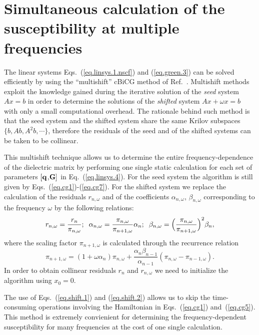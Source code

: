\documentclass[twocolumn,prb,showpacs,superscriptaddress]{revtex4}
\def\w{\omega}
\def\q{{\bf q}}
\def\G{{\bf G}}
\begin{document}
\section{Simultaneous calculation of the susceptibility at multiple frequencies}\label{app.multishift}

The linear systems Eqs.\ (\ref{eq.linsys.1.nscf}) and (\ref{eq.green.3})
can be solved efficiently by using the ``multishift'' 
cBiCG method of Ref.~.
Multishift methods exploit the knowledge gained during the iterative
solution of the {\it seed} system $Ax=b$ in order to determine the solutions 
of the {\it shifted} system $Ax+\w x=b$ with only a small computational overhead.
The rationale behind such method is that the seed system and the
shifted system share the same Krilov subspaces $\{b,Ab,A^2b,\cdots\}$,
therefore the residuals of the seed and of the shifted
systems can be taken to be collinear.\cite{frommer}

This multishift technique allows us to determine the
entire frequency-dependence of the dielectric matrix
by performing one single static calculation for each set of parameters $[\q$,$\G]$ in
Eq.\ (\ref{eq.linsys.4}).
For the seed system the algorithm is still given by Eqs.\ (\ref{eq.cg1})-(\ref{eq.cg7}).
For the shifted system we replace the calculation of the residuals
$r_{n,\w}$ and of the coefficients $\alpha_{n,\w}$, $\beta_{n,\w}$ corresponding
to the frequency $\w$ by the following relations:
  \begin{equation} \label{eq.shift.1}
  r_{n,\w}  =\frac{r_n}{\pi_{n,\w}};
  \hspace{0.2cm}
  \alpha_{n,\w}  =  \frac{\pi_{n,\w}}{\pi_{n+1,\w}}\alpha_n ;
  \hspace{0.2cm}
  \beta_{n,\w}  =  \Big(\frac{\pi_{n,\w}}{\pi_{n+1,\w}}\Big)^2\beta_n,
  \end{equation}
where the scaling factor $\pi_{n+1,\w}$ is calculated through the recurrence relation
  \begin{equation}\label{eq.shift.2}
  \pi_{n+1,\w} = (1+\w\alpha_n) \pi_{n,\w} + \frac{\alpha_n\beta_{n-1}}{\alpha_{n-1}}(\pi_{n,\w}-\pi_{n-1,\w}).
  \end{equation}
In order to obtain collinear residuals $r_n$ and $r_{n,\w}$ we need to
initialize the algorithm using $x_0=0$.

The use of Eqs.~(\ref{eq.shift.1}) and (\ref{eq.shift.2}) allows us to
skip the time-consuming operations involving the Hamiltonian in
Eqs.\ (\ref{eq.cg1}) and~(\ref{eq.cg5}).
This method is extremely convienient for determining the frequency-dependent
susceptibility for many frequencies at the cost of one single calculation.
\end{document}
